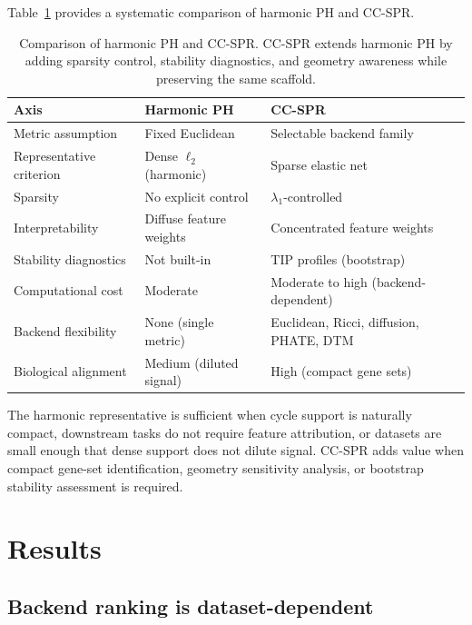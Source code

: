 \documentclass[12pt]{article}
\begin{document}
Table~\ref{tab:hphcompare} provides a systematic comparison of harmonic PH and CC-SPR.

\begin{table}[h]
\centering
\small
\begin{tabular}{p{2.5cm}p{3.0cm}p{3.0cm}}
\toprule
\textbf{Axis} & \textbf{Harmonic PH} & \textbf{CC-SPR} \\
\midrule
Metric assumption & Fixed Euclidean & Selectable backend family \\
Representative criterion & Dense $\ell_2$ (harmonic) & Sparse elastic net \\
Sparsity & No explicit control & $\lambda_1$-controlled \\
Interpretability & Diffuse feature weights & Concentrated feature weights \\
Stability diagnostics & Not built-in & TIP profiles (bootstrap) \\
Computational cost & Moderate & Moderate to high (backend-dependent) \\
Backend flexibility & None (single metric) & Euclidean, Ricci, diffusion, PHATE, DTM \\
Biological alignment & Medium (diluted signal) & High (compact gene sets) \\
\bottomrule
\end{tabular}
\caption{Comparison of harmonic PH and CC-SPR. CC-SPR extends harmonic PH by adding sparsity control, stability diagnostics, and geometry awareness while preserving the same scaffold.}
\label{tab:hphcompare}
\end{table}

The harmonic representative is sufficient when cycle support is naturally compact, downstream tasks do not require feature attribution, or datasets are small enough that dense support does not dilute signal.
CC-SPR adds value when compact gene-set identification, geometry sensitivity analysis, or bootstrap stability assessment is required.

\section{Results}
\label{sec:results}

\subsection{Backend ranking is dataset-dependent}
\label{sec:benchmark}
\end{document}
